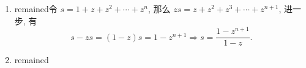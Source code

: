 \begin{enumerate}
\begin{proof}
\[        \]
        必要性. 令 $z_1 = \exp(i\theta_1)$, $z_2 = \exp(i\theta_2)$, 且
        \[
            c_1 = \exp\left(i\frac{\theta_1+\theta_2}{2}\right), c_2 = \exp\left(i\frac{\theta_1-\theta_2}{2}\right).    
        \]
        那么
        \[
            \overline{c_2} = \exp\overline{\left(i\frac{\theta_1-\theta_2}{2}\right)} = \exp\left[i\left(-\frac{\theta_1-\theta_2}{2}\right)\right] = \exp\left(i\frac{\theta_2-\theta_1}{2}\right).    
        \]
        显然 $z_1 = c_1c_2$, $z_2 = c_1\overline{c_2}$. 并且
        \begin{align*}
            |z_1| = |c_1c_2| &= |c_1||c_2| \\
            &= \sqrt{\cos^2\frac{\theta_1+\theta_2}{2} + \sin^2\frac{\theta_1+\theta_2}{2}}\sqrt{\cos^2\frac{\theta_1-\theta_2}{2} + \sin^2\frac{\theta_1-\theta_2}{2}} \\
            &= \sqrt{\cos^2\frac{\theta_1+\theta_2}{2} + \sin^2\frac{\theta_1+\theta_2}{2}}\sqrt{\cos^2\frac{\theta_2-\theta_1}{2} + \sin^2\frac{\theta_2-\theta_1}{2}} \\
            &= |c_1||\overline{c_2}| = |c_1\overline{c_2}| = |z_2|. \qedhere    
        \end{align*}
    \end{proof}
\item %
    {\color{red}remained}令 $s = 1 + z + z^2 + \cdots + z^n$, 那么 $zs = z + z^2 + z^3 + \cdots + z^{n+1}$, 进一步, 有
    \[
        s-zs = (1-z)s = 1 - z^{n+1}
        \Rightarrow s = \frac{1-z^{n+1}}{1-z}.   
    \]
\item %
    {\color{red}remained}
\end{enumerate}
% 
    